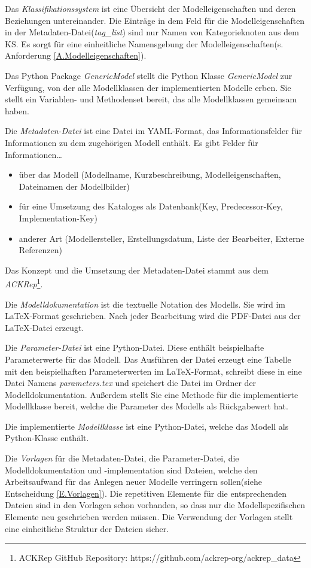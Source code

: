 Das \textit{Klassifikationssystem} ist eine Übersicht der Modelleigenschaften und deren Beziehungen untereinander. Die Einträge in dem Feld für die Modelleigenschaften in der Metadaten-Datei(\textit{tag\_list}) sind nur Namen von Kategorieknoten aus dem KS. Es sorgt für eine einheitliche Namensgebung der Modelleigenschaften(s. Anforderung \ref{A.Modelleigenschaften}). 

Das Python Package \textit{GenericModel} stellt die Python Klasse \textit{GenericModel} zur Verfügung, von der alle Modellklassen der implementierten Modelle erben. Sie stellt ein Variablen- und Methodenset bereit, das alle Modellklassen gemeinsam haben.

Die \textit{Metadaten-Datei} ist eine Datei im YAML-Format, das Informationsfelder für Informationen zu dem zugehörigen Modell enthält. Es gibt Felder für Informationen\dots 
\begin{itemize}[label=$\bullet$]
	\item über das Modell (Modellname, Kurzbeschreibung, Modelleigenschaften, Dateinamen der Modellbilder)
	\item für eine Umsetzung des Kataloges als Datenbank(Key, Predecessor-Key, Implementation-Key)
	\item anderer Art (Modellersteller, Erstellungsdatum, Liste der Bearbeiter, Externe Referenzen)
\end{itemize}
Das Konzept und die Umsetzung der Metadaten-Datei stammt aus dem \textit{ACKRep}\footnote{ACKRep GitHub Repository: https://github.com/ackrep-org/ackrep\_data}. 

Die \textit{Modelldokumentation} ist die textuelle Notation des Modells. Sie wird im \LaTeX-Format geschrieben. Nach jeder Bearbeitung wird die PDF-Datei aus der \LaTeX-Datei erzeugt. 

Die \textit{Parameter-Datei} ist eine Python-Datei. Diese enthält beispielhafte Parameterwerte für das Modell. Das Ausführen der Datei erzeugt eine Tabelle mit den beispielhaften Parameterwerten im \LaTeX-Format, schreibt diese in eine Datei Namens \textit{parameters.tex} und speichert die Datei im Ordner der Modelldokumentation. Außerdem stellt Sie eine Methode für die implementierte Modellklasse bereit, welche die Parameter des Modells als Rückgabewert hat.

Die implementierte \textit{Modellklasse} ist eine Python-Datei, welche das Modell als Python-Klasse enthält. 

Die \textit{Vorlagen} für die Metadaten-Datei, die Parameter-Datei, die Modelldokumentation und -implementation sind Dateien, welche den Arbeitsaufwand für das Anlegen neuer Modelle verringern sollen(siehe Entscheidung \ref{E.Vorlagen}). Die repetitiven Elemente für die entsprechenden Dateien sind in den Vorlagen schon vorhanden, so dass nur die Modellspezifischen Elemente neu geschrieben werden müssen. Die Verwendung der Vorlagen stellt eine einheitliche Struktur der Dateien sicher.

